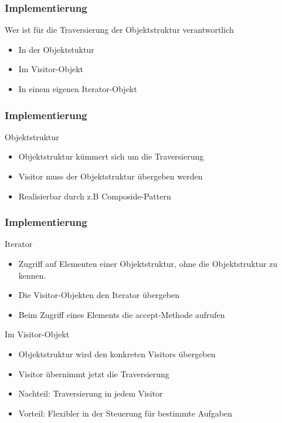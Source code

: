 \begin{frame}
	\frametitle{Implementierung}
  \begin{block}{Wer ist für die Traversierung der Objektstruktur verantwortlich}
  	\begin{itemize}
  		\item In der Objektstuktur
  		\item Im Visitor-Objekt
  		\item In einem eigenen Iterator-Objekt
  	\end{itemize}
  \end{block}
\end{frame}


\begin{frame}
	\frametitle{Implementierung}
  \begin{block}{Objektstruktur}
  	\begin{itemize}
  		\item Objektstruktur kümmert sich um die Traversierung 
  		\item Visitor muss der Objektstruktur übergeben werden
  		\item Realisierbar durch z.B Composide-Pattern
  	\end{itemize}
  \end{block}
\end{frame}

\begin{frame}
	\frametitle{Implementierung}
  \begin{block}{Iterator}
  	\begin{itemize}
  		\item Zugriff auf Elementen einer Objektstruktur, ohne die  Objektstruktur zu kennen.
  		\item Die Visitor-Objekten den Iterator übergeben
  		\item Beim Zugriff eines Elements die accept-Methode aufrufen

  	\end{itemize}
  \end{block}
	\begin{block}{Im Visitor-Objekt}
  	\begin{itemize}
  		\item Objektstruktur wird den konkreten Visitors übergeben
  		\item Visitor übernimmt jetzt die Traversierung
  		\item Nachteil: Traversierung in jedem Visitor
  		\item Vorteil: Flexibler in der Steuerung für bestimmte Aufgaben

  	\end{itemize}
  \end{block}
\end{frame}


